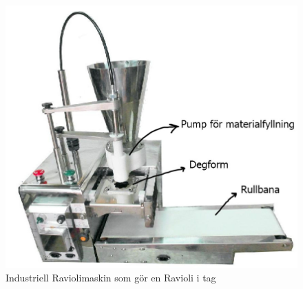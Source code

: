  \begin{figure}[ht]
 	\begin{center}
 		\includegraphics[scale=0.4]{images/industriell_machine_comment.jpg}
 		\caption{Industriell Raviolimaskin som gör en Ravioli i tag\cite{diytrade}}
 		\label{industraviol_2}	
 	\end{center}
 \end{figure}
 
 

 